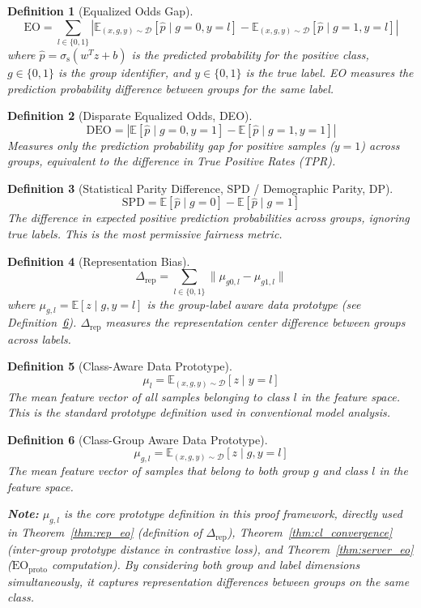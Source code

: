 \documentclass[11pt]{article}
\newtheorem{definition}{Definition}
\begin{document}
\begin{definition}[Equalized Odds Gap]
\label{def:eo}
$$\mathrm{EO} = \sum_{l \in \{0,1\}} \left| \mathbb{E}_{(x,g,y) \sim \mathcal{D}}[\hat{p} \mid g=0, y=l] - \mathbb{E}_{(x,g,y) \sim \mathcal{D}}[\hat{p} \mid g=1, y=l] \right|$$
where $\hat{p} = \sigma_{\text{s}}(w^T z + b)$ is the predicted probability for the positive class, $g \in \{0, 1\}$ is the group identifier, and $y \in \{0, 1\}$ is the true label. EO measures the prediction probability difference between groups for the same label.
\end{definition}

\begin{definition}[Disparate Equalized Odds, DEO]
\label{def:deo}
$$\mathrm{DEO} = \left| \mathbb{E}[\hat{p} \mid g=0, y=1] - \mathbb{E}[\hat{p} \mid g=1, y=1] \right|$$
Measures only the prediction probability gap for positive samples ($y=1$) across groups, equivalent to the difference in True Positive Rates (TPR).
\end{definition}

\begin{definition}[Statistical Parity Difference, SPD / Demographic Parity, DP]
\label{def:spd}
$$\mathrm{SPD} = \mathbb{E}[\hat{p} \mid g=0] - \mathbb{E}[\hat{p} \mid g=1]$$
The difference in expected positive prediction probabilities across groups, ignoring true labels. This is the most permissive fairness metric.
\end{definition}

\begin{definition}[Representation Bias]
\label{def:rep_bias}
$$\Delta_{\mathrm{rep}} = \sum_{l \in \{0,1\}} \|\mu_{g0,l} - \mu_{g1,l}\|$$
where $\mu_{g,l} = \mathbb{E}[z \mid g, y=l]$ is the group-label aware data prototype (see Definition~\ref{def:proto_gl}). $\Delta_{\mathrm{rep}}$ measures the representation center difference between groups across labels.
\end{definition}

\begin{definition}[Class-Aware Data Prototype]
\label{def:proto_l}
$$\mu_l = \mathbb{E}_{(x,g,y) \sim \mathcal{D}}[z \mid y=l]$$
The mean feature vector of all samples belonging to class $l$ in the feature space. This is the standard prototype definition used in conventional model analysis.
\end{definition}

\begin{definition}[Class-Group Aware Data Prototype]
\label{def:proto_gl}
$$\mu_{g,l} = \mathbb{E}_{(x,g,y) \sim \mathcal{D}}[z \mid g, y=l]$$
The mean feature vector of samples that belong to both group $g$ and class $l$ in the feature space.

\textbf{Note:} $\mu_{g,l}$ is the core prototype definition in this proof framework, directly used in Theorem~\ref{thm:rep_eo} (definition of $\Delta_{\mathrm{rep}}$), Theorem~\ref{thm:cl_convergence} (inter-group prototype distance in contrastive loss), and Theorem~\ref{thm:server_eo} ($\mathrm{EO}_{\mathrm{proto}}$ computation). By considering both group and label dimensions simultaneously, it captures representation differences between groups on the same class.
\end{definition}
\end{document}
